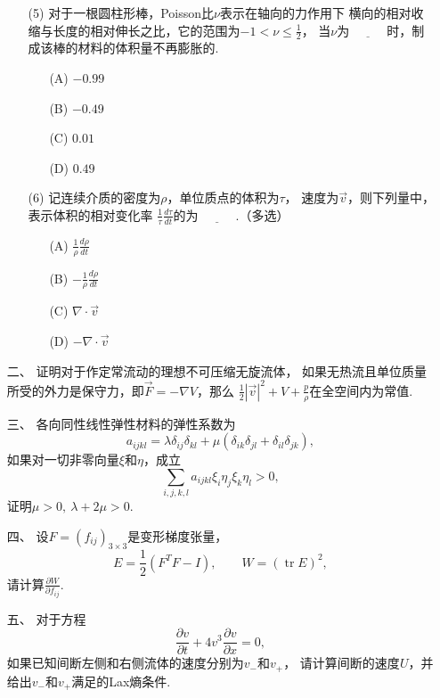 \begin{itemize}
\begin{itemize}
        \item[(5)] 对于一根圆柱形棒，Poisson比$\nu$表示在轴向的力作用下
        横向的相对收缩与长度的相对伸长之比，它的范围为$-1<\nu\le \frac12$，
        当$\nu$为$\underline{\qquad\quad}$时，制成该棒的材料的体积量不再膨胀的.
        \begin{itemize}
            \item[(A)] $-0.99$
            \item[(B)] $-0.49$
            \item[(C)] $0.01$
            \item[(D)] $0.49$
        \end{itemize}

        \item[(6)] 记连续介质的密度为$\rho$，单位质点的体积为$\tau$，
        速度为$\vec v$，则下列量中，表示体积的相对变化率
        $\frac1\tau\frac{d\tau}{dt}$的为$\underline{\qquad\quad}$.（多选）
        \begin{itemize}
            \item[(A)] $\frac1\rho\frac{d\rho}{dt}$
            \item[(B)] $-\frac1\rho\frac{d\rho}{dt}$
            \item[(C)] $\nabla\cdot\vec v$
            \item[(D)] $-\nabla\cdot\vec v$
        \end{itemize}
    \end{itemize}

    \item[二、]证明对于作定常流动的理想不可压缩无旋流体，
    如果无热流且单位质量所受的外力是保守力，即$\vec F=-\nabla V$，那么
    $\frac12|\vec v|^2+V+\frac{p}{\rho}$在全空间内为常值.

    \item[三、]各向同性线性弹性材料的弹性系数为
    \[
        a_{ijkl}=\lambda\delta_{ij}\delta_{kl}
        +\mu(\delta_{ik}\delta_{jl}+\delta_{il}\delta_{jk}),
    \]
    如果对一切非零向量$\xi$和$\eta$，成立
    \[
        \sum_{i,j,k,l}a_{ijkl}\xi_i\eta_j\xi_k\eta_l>0,
    \]
    证明$\mu>0,\ \lambda+2\mu>0$.

    \item[四、]设$F=(f_{ij})_{3\times 3}$是变形梯度张量，
    \[
        E=\frac12(F^TF-I),\qquad W=(\operatorname{tr}E)^2,
    \]
  请计算$\frac{\partial W}{\partial f_{ij}}$.

    \item[五、]对于方程
    \[
        \frac{\partial v}{\partial t}+4v^3\frac{\partial v}{\partial x}=0,
    \]
    如果已知间断左侧和右侧流体的速度分别为$v_-$和$v_+$，
    请计算间断的速度$U$，并给出$v_-$和$v_+$满足的Lax熵条件.


\end{itemize}
